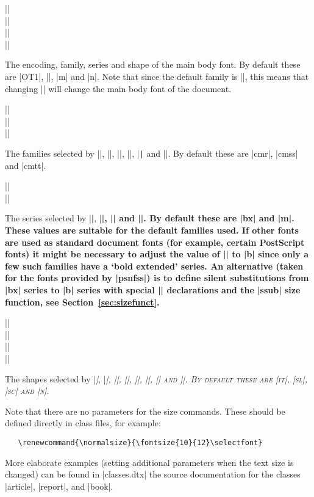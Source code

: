 \documentclass{ltxguide}[1995/11/28]
\begin{document}
\begin{decl}
  |\encodingdefault| \\
  |\familydefault|   \\
  |\seriesdefault|   \\
  |\shapedefault|
\end{decl}
The encoding, family, series and shape of the main body font.  By
default these are |OT1|, |\rmdefault|, |m| and |n|.  Note that since the
default family is |\rmdefault|, this means that changing |\rmdefault|
will change the main body font of the document.

\begin{decl}
  |\rmdefault| \\
  |\sfdefault| \\
  |\ttdefault|
\end{decl}
The families selected by |\textrm|, |\rmfamily|, |\textsf|, |\sffamily|,
|\texttt| and |\ttfamily|.  By default these are |cmr|, |cmss| and
|cmtt|.

\begin{decl}
  |\bfdefault| \\
  |\mddefault|
\end{decl}
The series selected by |\textbf|, |\bfseries|, |\textmd| and
|\mdseries|.  By default these are |bx| and |m|.  These values are
suitable for the default families used. If other fonts are used as
standard document fonts (for example, certain PostScript fonts) it might
be necessary to adjust the value of |\bfdefault| to |b| since only a few
such families have a `bold extended' series.  An alternative (taken for
the fonts provided by |psnfss|) is to define silent substitutions from
|bx| series to |b| series with special |\DeclareFontShape| declarations
and the |ssub| size function, see Section~\ref{sec:sizefunct}.

\begin{decl}
  |\itdefault| \\
  |\sldefault| \\
  |\scdefault| \\
  |\updefault|
\end{decl}
The shapes selected by |\textit|, |\itshape|, |\textsl|, |\slshape|,
|\textsc|, |\scshape|, |\textup| and |\upshape|.  By default these are
|it|, |sl|, |sc| and |n|.

Note that there are no parameters for the size commands.  These should
be defined directly in class files, for example:
\begin{verbatim}
   \renewcommand{\normalsize}{\fontsize{10}{12}\selectfont}
\end{verbatim}
More elaborate examples (setting additional parameters when the text
size is changed) can be found in |classes.dtx| the source documentation
for the classes |article|, |report|, and |book|.
\end{document}
